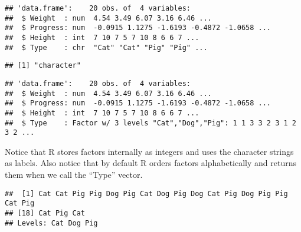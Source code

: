 \documentclass[]{article}
\newenvironment{Shaded}{\begin{snugshade}}{\end{snugshade}}
\newcommand{\KeywordTok}[1]{\textcolor[rgb]{0.13,0.29,0.53}{\textbf{#1}}}
\newcommand{\StringTok}[1]{\textcolor[rgb]{0.31,0.60,0.02}{#1}}
\newcommand{\CommentTok}[1]{\textcolor[rgb]{0.56,0.35,0.01}{\textit{#1}}}
\newcommand{\OperatorTok}[1]{\textcolor[rgb]{0.81,0.36,0.00}{\textbf{#1}}}
\newcommand{\NormalTok}[1]{#1}
\begin{document}
\begin{verbatim}
## 'data.frame':    20 obs. of  4 variables:
##  $ Weight  : num  4.54 3.49 6.07 3.16 6.46 ...
##  $ Progress: num  -0.0915 1.1275 -1.6193 -0.4872 -1.0658 ...
##  $ Height  : int  7 10 7 5 7 10 8 6 6 7 ...
##  $ Type    : chr  "Cat" "Cat" "Pig" "Pig" ...
\end{verbatim}

\begin{Shaded}
\end{Shaded}

\begin{verbatim}
## [1] "character"
\end{verbatim}

\begin{Shaded}
\end{Shaded}

\begin{verbatim}
## 'data.frame':    20 obs. of  4 variables:
##  $ Weight  : num  4.54 3.49 6.07 3.16 6.46 ...
##  $ Progress: num  -0.0915 1.1275 -1.6193 -0.4872 -1.0658 ...
##  $ Height  : int  7 10 7 5 7 10 8 6 6 7 ...
##  $ Type    : Factor w/ 3 levels "Cat","Dog","Pig": 1 1 3 3 2 3 1 2 3 2 ...
\end{verbatim}

Notice that R stores factors internally as integers and uses the
character strings as labels. Also notice that by default R orders
factors alphabetically and returns them when we call the ``Type''
vector.

\begin{Shaded}
\end{Shaded}

\begin{verbatim}
##  [1] Cat Cat Pig Pig Dog Pig Cat Dog Pig Dog Cat Pig Dog Pig Pig Cat Pig
## [18] Cat Pig Cat
## Levels: Cat Dog Pig
\end{verbatim}
\end{document}

